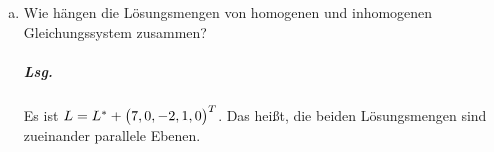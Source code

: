 \documentclass{scrreprt}
\begin{document}
\begin{enumerate}[(a)]

\item Wie hängen die Lösungsmengen von homogenen und inhomogenen Gleichungssystem
  zusammen?

  \subparagraph{Lsg.} Es ist $L = L^* + \qty\big(7, 0, -2, 1, 0)^T$.
  Das heißt, die beiden Lösungsmengen sind zueinander parallele Ebenen.
\end{enumerate}

\newpage
\end{document}
